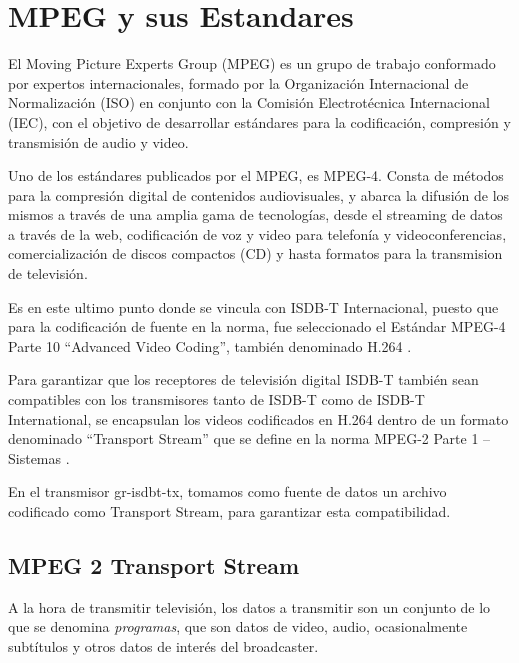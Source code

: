 \section{MPEG y sus Estandares}

El Moving Picture Experts Group (MPEG)\cite{MPEG} es un grupo de trabajo conformado por expertos internacionales, formado por la Organización Internacional de Normalización (ISO) en conjunto con la Comisión Electrotécnica Internacional (IEC), con el objetivo de desarrollar estándares para la codificación, compresión y transmisión de audio y video.

Uno de los estándares publicados por el MPEG, es MPEG-4. Consta de métodos para la compresión digital de contenidos audiovisuales,  y abarca la difusión de los mismos a través de una amplia gama de tecnologías, desde el streaming de datos a través de la web, codificación de voz y video para telefonía y videoconferencias, comercialización de discos compactos (CD) y hasta formatos para la transmision de televisión. 

Es en este ultimo punto donde se vincula con ISDB-T Internacional, puesto que para la codificación de fuente en la norma, fue seleccionado el Estándar MPEG-4 Parte 10 “Advanced Video Coding”, también denominado H.264 \cite{mpeg4_10}.

Para garantizar que los receptores de televisión digital ISDB-T también sean compatibles con los transmisores tanto de ISDB-T como de ISDB-T International, se encapsulan los videos codificados en H.264 dentro de un formato denominado “Transport Stream” que se define en la norma MPEG-2 Parte 1 – Sistemas \cite{mpeg2_1}.

En el transmisor gr-isdbt-tx, tomamos como fuente de datos un archivo codificado como Transport Stream, para garantizar esta compatibilidad.

	\subsection{MPEG 2 Transport Stream}
	
	A la hora de transmitir televisión, los datos a transmitir son un conjunto de lo que se denomina \textit{programas}, que son datos de video, audio, ocasionalmente subtítulos y otros datos de interés del broadcaster.  
	
